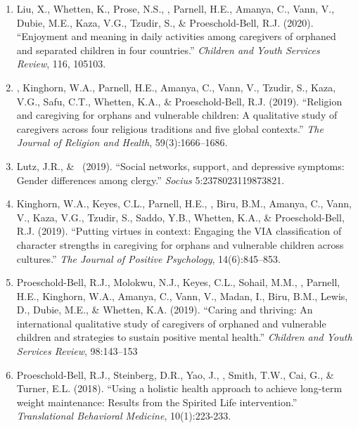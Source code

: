 \begin{enumerate}
\item Liu, X., Whetten, K., Prose, N.S., \Eagle, Parnell, H.E., Amanya, C., Vann, V., Dubie, M.E., Kaza, V.G., Tzudir, S., \& Proeschold-Bell, R.J. (2020). ``Enjoyment and meaning in daily activities among caregivers of orphaned and separated children in four countries.'' \emph{Children and Youth Services Review}, 116, 105103. 

\item \Eagle, Kinghorn, W.A., Parnell, H.E., Amanya, C., Vann, V., Tzudir, S., Kaza, V.G., Safu, C.T., Whetten, K.A., \& Proeschold-Bell, R.J. (2019). ``Religion and caregiving for orphans and vulnerable children: A qualitative study of caregivers across four religious traditions and five global contexts.'' \emph{The Journal of Religion and Health}, 59(3):1666--1686. 

\item Lutz, J.R., \& \Eagle\CS\ (2019). ``Social networks, support, and depressive symptoms: Gender differences among clergy.'' \emph{Socius} 5:2378023119873821. 

\item Kinghorn, W.A., Keyes, C.L., Parnell, H.E., \Eagle, Biru, B.M., Amanya, C., Vann, V., Kaza, V.G., Tzudir, S., Saddo, Y.B., Whetten, K.A., \& Proeschold-Bell, R.J. (2019). ``Putting virtues in context: Engaging the VIA classification of character strengths in caregiving for orphans and vulnerable children across cultures.'' \emph{The Journal of Positive Psychology}, 14(6):845--853. 

\item Proeschold-Bell, R.J., Molokwu, N.J., Keyes, C.L., Sohail, M.M., \Eagle, Parnell, H.E., Kinghorn, W.A., Amanya, C., Vann, V., Madan, I., Biru, B.M., Lewis, D., Dubie, M.E., \& Whetten, K.A. (2019). ``Caring and thriving: An international qualitative study of caregivers of orphaned and vulnerable children and strategies to sustain positive mental health.''  \emph{Children and Youth Services Review}, 98:143--153  

\item Proeschold-Bell, R.J., Steinberg, D.R., Yao, J., \Eagle, Smith, T.W., Cai, G., \& Turner, E.L. (2018). ``Using a holistic health approach to achieve long-term weight maintenance: Results from the Spirited Life intervention.'' \emph{Translational Behavioral Medicine}, 10(1):223-233. 


\end{enumerate}
